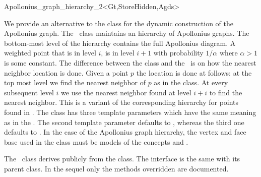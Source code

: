 
\begin{ccRefClass}{Apollonius_graph_hierarchy_2<Gt,StoreHidden,Agds>}

\ccDefinition

We provide an alternative to the class
 for the dynamic
construction of the Apollonius graph. The \ccRefName\ class maintains
an hierarchy of Apollonius graphs. The bottom-most level of the
hierarchy contains the full Apollonius diagram. A weighted point that
is in level $i$, is in level $i+1$ with probability $1/\alpha$
where $\alpha > 1$ is some constant. The difference between the
 class and the
\ccRefName\ is on how the nearest neighbor location is done. Given a
point $p$ the location is done at follows: at the top most level we
find the nearest neighbor of $p$ as in the
 class. At every
subsequent level $i$ we use the nearest neighbor found at level $i+i$
to find the nearest neighbor. This is a variant of the corresponding
hierarchy for points found in \cite{d-iirdt-98}.
%
The class has three template parameters which have the same meaning as
in the . The second
template parameter defaults to , whereas the third one
defaults to . 
In the case of the Apollonius graph hierarchy, the vertex and face
base used in the  class
must be models of the concepts
 and
.

The \ccRefName\ class derives publicly from the
 class. The interface is
the same with its parent class. In the sequel only the methods
overridden are documented.



\end{ccRefClass}
